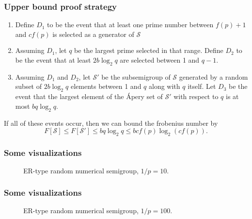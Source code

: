 \documentclass{beamer}
\begin{document}
\begin{frame}
    \frametitle{Upper bound proof strategy}
    \begin{enumerate}
        \item Define $D_1$ to be the event that at least one prime number between $f(p) + 1$ and $cf(p)$ is selected as a generator of $\mathcal{S}$
        \item Assuming $D_1$, let $q$ be the largest prime selected in that range. Define $D_2$ to be the event that at least $2b\log_2 q$ are selected between 1 and $q - 1$.
        \item Assuming $D_1$ and $D_2$, let $\mathcal{S}'$ be the subsemigroup of $\mathcal{S}$ generated by a random subset of $2b\log_2 q$ elements between 1 and $q$ along with $q$ itself. Let $D_3$ be the event that the largest element of the Ápery set of $\mathcal{S}'$ with respect to $q$ is at most $bq\log_2q$.
    \end{enumerate}
    If all of these events occur, then we can bound the frobenius number by 
    \[F[\mathcal{S}]\leq F[\mathcal{S}'] \leq bq\log_2 q \leq bcf(p)\log_2(cf(p)).\]
\end{frame}
\begin{frame}
    \frametitle{Some visualizations}
    \begin{figure}
        \begin{center}
            \scalebox{0.8}{}
        \end{center}
        \caption{ER-type random numerical semigroup, $1/p = 10$.}
    \end{figure}

\end{frame}

\begin{frame}
    \frametitle{Some visualizations}
    \begin{figure}
        \begin{center}
            \scalebox{0.8}{}
        \end{center}
        \caption{ER-type random numerical semigroup, $1/p = 100$.}
    \end{figure}

\end{frame}
\end{document}
